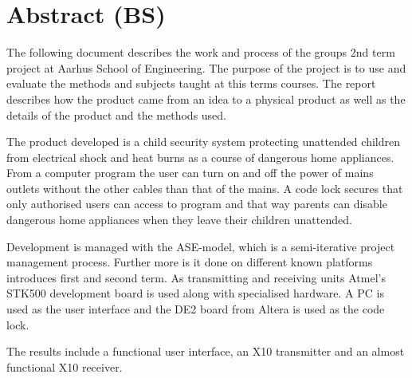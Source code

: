 \chapter*{Abstract (BS)}
The following document describes the work and process of the groups 2nd term project at Aarhus School of Engineering. The purpose of the project is to use and evaluate the methods and subjects taught at this terms courses. The report describes how the product came from an idea to a physical product as well as the details of the product and the methods used.

The product developed is a child security system protecting unattended children from electrical shock and heat burns as a course of dangerous home appliances. From a computer program the user can turn on and off the power of mains outlets without the other cables than that of the mains. A code lock secures that only authorised users can access to program and that way parents can disable dangerous home appliances when they leave their children unattended.

Development is managed with the ASE-model, which is a semi-iterative project management process. Further more is it done on different known platforms introduces first and second term. As transmitting and receiving units Atmel’s STK500 development board is used along with specialised hardware. A PC is used as the user interface and the DE2 board from Altera is used as the code lock.

The results include a functional user interface, an X10 transmitter and an almost functional X10 receiver.